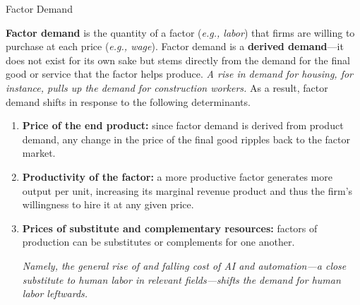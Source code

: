 \documentclass[10pt]{article}
\begin{document}
  \begin{core}{Factor Demand}

    \textbf{Factor demand} is the quantity of a factor (\textit{e.g., labor}) that firms are willing to purchase at each price (\textit{e.g., wage}). Factor demand is a \textbf{derived demand}---it does not exist for its own sake but stems directly from the demand for the final good or service that the factor helps produce. \textit{A rise in demand for housing, for instance, pulls up the demand for construction workers.} As a result, factor demand shifts in response to the following determinants.

    \begin{enumerate}

      \item \textbf{Price of the end product:} since factor demand is derived from product demand, any change in the price of the final good ripples back to the factor market.

      \item \textbf{Productivity of the factor:} a more productive factor generates more output per unit, increasing its marginal revenue product and thus the firm's willingness to hire it at any given price.

      \item \textbf{Prices of substitute and complementary resources:} factors of production can be substitutes or complements for one another.

      \textit{Namely, the general rise of and falling cost of AI and automation---a close substitute to human labor in relevant fields---shifts the demand for human labor leftwards.}

    \end{enumerate}

  \end{core}
\end{document}
